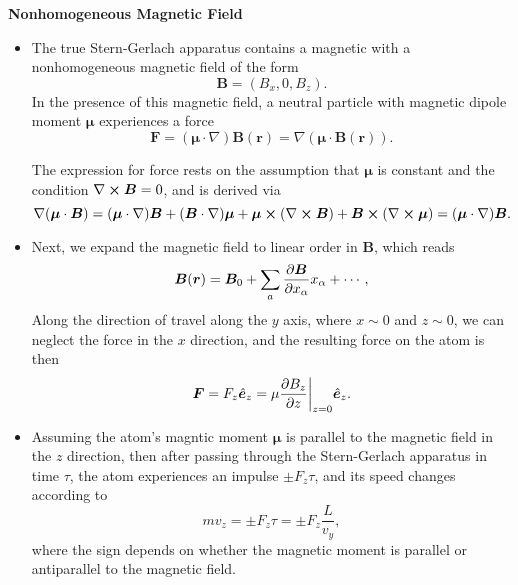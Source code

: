 \documentclass[11pt, a4paper]{article}
\renewcommand{\curl}{\nabla \cross}
\renewcommand{\grad}{\nabla}
\newcommand{\SG}{Stern-Gerlach\xspace}
\renewcommand{\vec}[1]{\bm{#1}}  %
\newcommand{\uvec}[1]{\hat{\vec{#1}}}  %
\renewcommand{\r}{\vec{r}}  %
\newcommand{\B}{\vec{B}}  %
\newcommand{\m}{\vec{\mu}}  %
\begin{document}
\textbf{Nonhomogeneous Magnetic Field}
\begin{itemize}
    \item The true \SG apparatus contains a magnetic with a nonhomogeneous magnetic field of the form
    \begin{equation*}
        \B = (B_{x}, 0, B_{z}).
    \end{equation*}
    In the presence of this magnetic field, a neutral particle with magnetic dipole moment $ \m $ experiences a force
    \begin{equation*}
        \vec{F} = (\vec{\mu} \cdot \grad)\B(\r) = \grad (\m \cdot \B(\r)).
    \end{equation*}
   

    The expression for force rests on the assumption that $ \m $ is constant and the condition $ \curl \B = 0 $, and is derived via
    \begin{equation*}
        \grad (\m \cdot \B) = (\m \cdot \grad)\B + (\B \cdot \grad)\m + \m \cross (\curl \B) + \B \cross (\curl \m) = (\m \cdot \grad)\B.
    \end{equation*}
    
    \item Next, we expand the magnetic field to linear order in $ \B $, which reads
    \begin{equation*}
        \B(\r) = \B_{0} + \sum_{a} \pdv{\B}{x_{\alpha}}x_{\alpha} + \cdots,
    \end{equation*}
    Along the direction of travel along the $ y $ axis, where $ x \sim 0 $ and $ z \sim 0 $, we can neglect the force in the $ x $ direction, and the resulting force on the atom is then
    \begin{equation*}
        \vec{F} = F_{z}\uvec{e}_{z} = \mu \pdv{B_{z}}{z}\bigg |_{z=0} \uvec{e}_{z}.
    \end{equation*}
    
    \item Assuming the atom's magntic moment $ \m $ is parallel to the magnetic field in the $ z $ direction, then after passing through the \SG apparatus in time $ \tau $, the atom experiences an impulse $ \pm F_{z} \tau $, and its speed changes according to
    \begin{equation*}
        m v_{z} = \pm F_{z} \tau = \pm F_{z} \frac{L}{v_{y}},
    \end{equation*}
    where the sign depends on whether the magnetic moment is parallel or antiparallel to the magnetic field.


\end{itemize}
\end{document}
